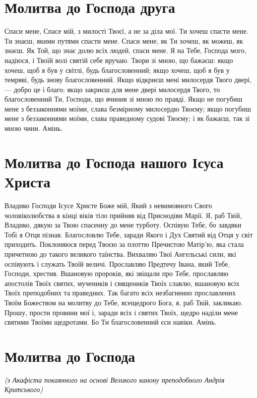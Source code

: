 \documentclass[chapters.tex]{subfiles}
\begin{document}
\section{Молитва до Господа друга}
Спаси мене, Спасе мій, з милості Твоєї, а не за діла мої. Ти хочеш спасти мене. Ти знаєш, якими путями спасти мене. Спаси мене, як Ти хочеш, як можеш, як знаєш. Як Той, що знає долю всіх людей, спаси мене. Я на Тебе, Господа мого, надіюся, і Твоїй волі святій себе вручаю. Твори зі мною, що бажаєш: якщо хочеш, щоб я був у світлі, будь благословенний; якщо хочеш, щоб я був у темряві, будь знову благословенний. Якщо відкриєш мені милосердя Твого двері, — добро це і благо; якщо закриєш для мене двері милосердя Твого, то благословенний Ти, Господи, що вчинив зі мною по правді. Якщо не погубиш мене з беззаконнями моїми, слава безмірному милосердю Твоєму; якщо погубиш мене з беззаконнями моїми, слава праведному судові Твоєму; і як бажаєш, так зі мною чини. Амінь.

\section{Молитва до Господа нашого Ісуса Христа}
Владико Господи Ісусе Христе Боже мій, Який з невимовного Свого чоловіколюбства в кінці віків тіло прийняв від Приснодіви Марії. Я, раб Твій, Владико, дякую за Твою спасенну до мене турботу. Оспівую Тебе, бо завдяки Тобі я Отця пізнав. Благословлю Тебе, заради Якого і Дух Святий від Отця у світ приходить. Поклоняюся перед Твоєю за плоттю Пречистою Матір’ю, яка стала причетною до такого великого таїнства. Вихваляю Твої Ангельські сили, які оспівують і служать Твоїй величі. Прославляю Предтечу Івана, який Тебе, Господи, хрестив. Вшановую пророків, які звіщали про Тебе, прославляю апостолів Твоїх святих, мучеників і священиків Твоїх славлю, вшановую всіх Твоїх преподобних та праведних. Так багато всіх незбагненно прославлених Твоїм Божеством на молитву до Тебе, всещедрого Бога, я, раб Твій, закликаю. Прошу, прости провини мої і, заради всіх і святих Твоїх, щедро наділи мене святими Твоїми щедротами. Бо Ти благословенний єси навіки. Амінь.

\section{Молитва до Господа}
\emph{(з Акафіста покаянного на основі Великого канону преподобного Андрія Критського)}
\end{document}
